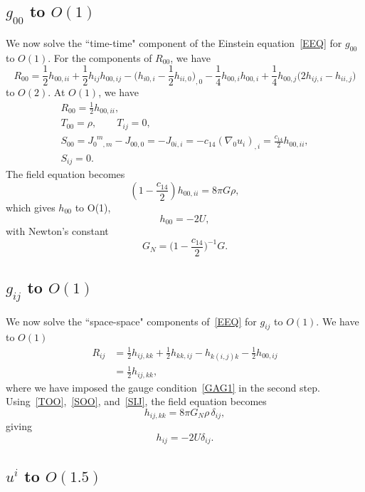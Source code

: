 \documentclass[aps,prd,preprint,amsmath,amssymb]{revtex4}
\def\beq{\begin{equation}}
\def\eeq{\end{equation}}
\def\ph{\phantom}
\def\half{\frac{1}{2}}
\begin{document}
\subsection{$g_{00}$ to $O(1)$}

We now solve the ``time-time" component of the Einstein
equation~\eqref{EEQ} for $g_{00}$ to $O(1)$. For the components of
$R_{00}$, we have
%
\beq\label{ROOa}
    R_{00} = \half h_{00,ii}
    + \half h_{ij}h_{00,ij} -
    \big(h_{i0,i} - \half h_{ii,0}\big)_{,0}
    -\frac{1}{4} h_{00,i}h_{00,i}
    +\frac{1}{4} h_{00,j}\big(2h_{ij,i} - h_{ii,j}\big)
\eeq
%
to $O(2)$. At $O(1)$, we have
%
\begin{gather}
    R_{00}=\half h_{00,ii},\\
    T_{00}=\rho,\qquad
    T_{ij} = 0,\label{TOO}\\
    S_{00}= J_{0\ph{m},m}^{\ph0 m} - J_{00,0} = -J_{0i,i}
    = -c_{14} (\nabla_0 u_i)_{,i} =
    \frac{c_{14}}{2}h_{00,ii},\label{SOO}\\
    S_{ij}= 0\label{SIJ}.
\end{gather}
%
The field equation becomes
%
\beq
    (1-\frac{c_{14}}{2})h_{00,ii} = 8\pi G \rho,
\eeq
%
which gives $h_{00}$ to O(1),
%
\beq\label{HOO}
    h_{00} = -2 U,
\eeq
%
with Newton's constant
%
\beq\label{GNewt}
    G_N = \big(1-\frac{c_{14}}{2}\big)^{-1} G.
\eeq
%
%
\subsection{$g_{ij}$ to $O(1)$}
%

We now solve the ``space-space" components of~\eqref{EEQ} for
$g_{ij}$ to $O(1)$. We have to $O(1)$
%
\beq\begin{split}
    R_{ij} &= \half h_{ij,kk}+\half h_{kk,ij}-h_{k(i,j)k}
        -\half h_{00,ij}\\
        &=\half h_{ij,kk},
\end{split}\eeq
%
where we have imposed the gauge condition~\eqref{GAG1} in the
second step.  Using~\eqref{TOO},~\eqref{SOO}, and~\eqref{SIJ}, the
field equation becomes
%
\beq
    h_{ij,kk} = 8\pi G_N \rho\, \delta_{ij},
\eeq
%
giving
%
\beq\label{HIJ}
    h_{ij} = -2 U \delta_{ij}.
\eeq
%
%
%
\subsection{$u^i$ to $O(1.5)$}
%
\end{document}
